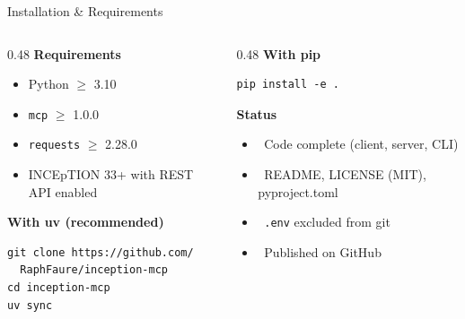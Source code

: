 \documentclass[aspectratio=169, 10pt]{beamer}
\newcommand{\done}{\textcolor{inc-green}{\faCheckCircle}}
\begin{document}
\begin{frame}{Installation \& Requirements}

  \begin{columns}
    \begin{column}{0.48\textwidth}
      \textbf{Requirements}
      \begin{itemize}
        \item Python $\geq$ 3.10
        \item \texttt{mcp} $\geq$ 1.0.0
        \item \texttt{requests} $\geq$ 2.28.0
        \item INCEpTION 33+ with REST API enabled
      \end{itemize}

      \bigskip
      \textbf{With uv (recommended)}
      \begin{lstlisting}
git clone https://github.com/
  RaphFaure/inception-mcp
cd inception-mcp
uv sync
      \end{lstlisting}
    \end{column}
    \begin{column}{0.48\textwidth}
      \textbf{With pip}
      \begin{lstlisting}
pip install -e .
      \end{lstlisting}

      \bigskip
      \textbf{Status}
      \begin{itemize}
        \item \done~Code complete (client, server, CLI)
        \item \done~README, LICENSE (MIT), pyproject.toml
        \item \done~\texttt{.env} excluded from git
        \item \done~Published on GitHub
      \end{itemize}
    \end{column}
  \end{columns}
\end{frame}
\end{document}
